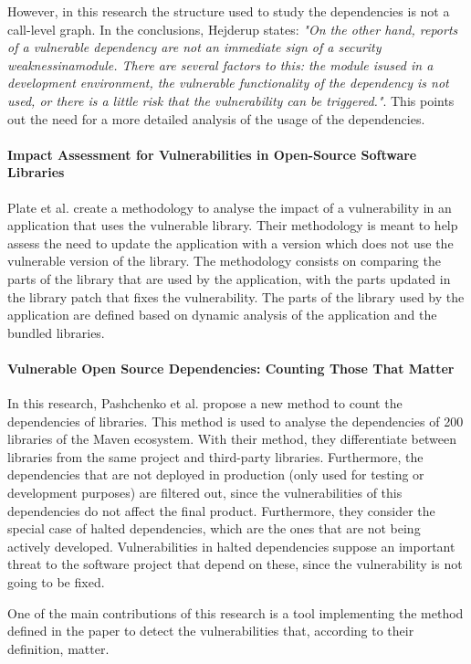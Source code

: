 However, in this research the structure used to study the dependencies is not a call-level graph. In the conclusions, Hejderup states: \textit{"On the other hand, reports of a vulnerable dependency are not an immediate sign of a security weaknessinamodule. There are several factors to this: the module isused in a development environment, the vulnerable functionality of the dependency is not used, or there is a little risk that the vulnerability can be triggered."}. This points out the need for a more detailed analysis of the usage of the dependencies.

\paragraph{Impact Assessment for Vulnerabilities in Open-Source Software Libraries \cite{plate2015impact}}
Plate et al. create a methodology to analyse the impact of a vulnerability in an application that uses the vulnerable library. Their methodology is meant to help assess the need to update the application with a version which does not use the vulnerable version of the library.
The methodology consists on comparing the parts of the library that are used by the application, with the parts updated in the library patch that fixes the vulnerability. The parts of the library used by the application are defined based on dynamic analysis of the application and the bundled libraries.

\paragraph{Vulnerable Open Source Dependencies: Counting Those That Matter \cite{pashchenko2018vulnerable}}
In this research, Pashchenko et al. propose a new method to count the dependencies of libraries. This method is used to analyse the dependencies of 200 libraries of the Maven ecosystem. With their method, they differentiate between libraries from the same project and third-party libraries. Furthermore, the dependencies that are not deployed in production (only used for testing or development purposes) are filtered out, since the vulnerabilities of this dependencies do not affect the final product. Furthermore, they consider the special case of halted dependencies, which are the ones that are not being actively developed. Vulnerabilities in halted dependencies suppose an important threat to the software project that depend on these, since the vulnerability is not going to be fixed.

One of the main contributions of this research is a tool implementing the method defined in the paper to detect the vulnerabilities that, according to their definition, matter.


